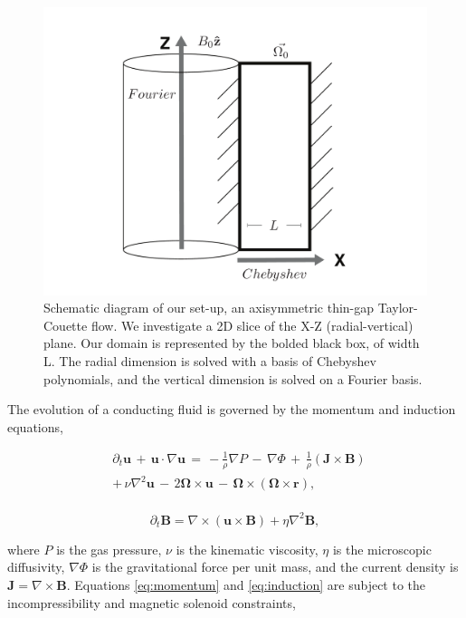 \documentclass{emulateapj}
\newcommand{\beq}{\begin{equation}}
\newcommand{\eeq}{\end{equation}}
\begin{document}
\begin{figure}[h!]
\centering
\includegraphics[trim=5cm 0cm 0cm 0cm, scale=.35]{setup_diagram-eps-converted-to.pdf}
\caption{Schematic diagram of our set-up, an axisymmetric thin-gap Taylor-Couette flow. We investigate a 2D slice of the X-Z (radial-vertical) plane. Our domain is represented by the bolded black box, of width L. The radial dimension is solved with a basis of Chebyshev polynomials, and the vertical dimension is solved on a Fourier basis. }\label{fig:setup}
\end{figure}

The evolution of a conducting fluid is governed by the momentum and induction equations,

\beq\label{eq:momentum}
\begin{split}
& \partial_t \mathbf{u} \, + \, \mathbf{u} \cdot \nabla \mathbf{u} \, = \, -\frac{1}{\rho}\nabla P \, - \, \nabla\Phi \, + \, \frac{1}{\rho} \left(\mathbf{J}\times\mathbf{B}\right) \, \\
& + \, \nu\nabla^2 \mathbf{u} \, - \, 2\mathbf{\Omega} \times \mathbf{u} \, - \, \mathbf{\Omega} \times \left(\mathbf{\Omega} \times \mathbf{r} \right), \\
\end{split}
\eeq

\beq\label{eq:induction}
\partial_t \mathbf{B} = \nabla \times \left(\mathbf{u} \times \mathbf{B}\right) + \eta\nabla^2\mathbf{B},
\eeq

where $P$ is the gas pressure, $\nu$ is the kinematic viscosity, $\eta$ is the microscopic diffusivity, $\nabla\Phi$ is the gravitational force per unit mass, and the current density is $\mathbf{J} = \nabla\times\mathbf{B}$.
Equations \ref{eq:momentum} and \ref{eq:induction} are subject to the incompressibility and magnetic solenoid constraints,
\end{document}
